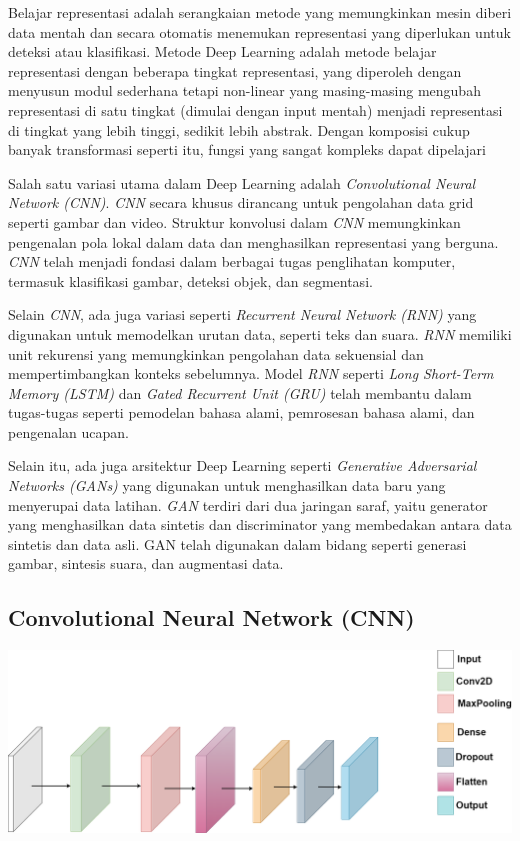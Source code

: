 Belajar representasi adalah serangkaian metode yang memungkinkan mesin diberi data mentah dan secara otomatis menemukan representasi yang diperlukan untuk deteksi atau klasifikasi. Metode Deep Learning adalah metode belajar representasi dengan beberapa tingkat representasi, yang diperoleh dengan menyusun modul sederhana tetapi non-linear yang masing-masing mengubah representasi di satu tingkat (dimulai dengan input mentah) menjadi representasi di tingkat yang lebih tinggi, sedikit lebih abstrak. Dengan komposisi cukup banyak transformasi seperti itu, fungsi yang sangat kompleks dapat dipelajari \cite{smith2007teaching}

Salah satu variasi utama dalam Deep Learning adalah \textit{Convolutional Neural Network (CNN)}. \textit{CNN} secara khusus dirancang untuk pengolahan data grid seperti gambar dan video. Struktur konvolusi dalam \textit{CNN} memungkinkan pengenalan pola lokal dalam data dan menghasilkan representasi yang berguna. \textit{CNN} telah menjadi fondasi dalam berbagai tugas penglihatan komputer, termasuk klasifikasi gambar, deteksi objek, dan segmentasi.

Selain \textit{CNN}, ada juga variasi seperti \textit{Recurrent Neural Network (RNN)} yang digunakan untuk memodelkan urutan data, seperti teks dan suara. \textit{RNN} memiliki unit rekurensi yang memungkinkan pengolahan data sekuensial dan mempertimbangkan konteks sebelumnya. Model \textit{RNN} seperti \textit{Long Short-Term Memory (LSTM)} dan \textit{Gated Recurrent Unit (GRU)} telah membantu dalam tugas-tugas seperti pemodelan bahasa alami, pemrosesan bahasa alami, dan pengenalan ucapan.

Selain itu, ada juga arsitektur Deep Learning seperti \textit{Generative Adversarial Networks (GANs)} yang digunakan untuk menghasilkan data baru yang menyerupai data latihan. \textit{GAN} terdiri dari dua jaringan saraf, yaitu generator yang menghasilkan data sintetis dan discriminator yang membedakan antara data sintetis dan data asli. GAN telah digunakan dalam bidang seperti generasi gambar, sintesis suara, dan augmentasi data.

\subsection{Convolutional Neural Network (CNN)}
\begin{center}
  \includegraphics[width=1.0\linewidth]{gambar/bener/Arsitektur_CNN_Umum.png}
  \label{fig:Arsitektur Umum Convolutional Neural Network}
\end{center}

